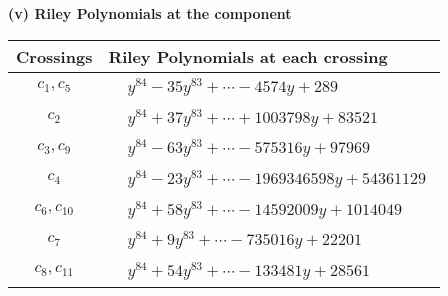 \documentclass[1p]{elsarticle_modified}
\theoremstyle{definition}
\begin{document}
\flushleft \textbf{(v) Riley Polynomials at the component}\newline \\
\begin{tabular}{m{50pt}|m{274pt}}
Crossings & \hspace{64pt}Riley Polynomials at each crossing \\
\hline $$\begin{aligned}c_{1},c_{5}\end{aligned}$$&$\begin{aligned}
&y^{84}-35 y^{83}+\cdots-4574 y+289
\end{aligned}$\\
\hline $$\begin{aligned}c_{2}\end{aligned}$$&$\begin{aligned}
&y^{84}+37 y^{83}+\cdots+1003798 y+83521
\end{aligned}$\\
\hline $$\begin{aligned}c_{3},c_{9}\end{aligned}$$&$\begin{aligned}
&y^{84}-63 y^{83}+\cdots-575316 y+97969
\end{aligned}$\\
\hline $$\begin{aligned}c_{4}\end{aligned}$$&$\begin{aligned}
&y^{84}-23 y^{83}+\cdots-1969346598 y+54361129
\end{aligned}$\\
\hline $$\begin{aligned}c_{6},c_{10}\end{aligned}$$&$\begin{aligned}
&y^{84}+58 y^{83}+\cdots-14592009 y+1014049
\end{aligned}$\\
\hline $$\begin{aligned}c_{7}\end{aligned}$$&$\begin{aligned}
&y^{84}+9 y^{83}+\cdots-735016 y+22201
\end{aligned}$\\
\hline $$\begin{aligned}c_{8},c_{11}\end{aligned}$$&$\begin{aligned}
&y^{84}+54 y^{83}+\cdots-133481 y+28561
\end{aligned}$\\
\hline
\end{tabular}\\~\\
\end{document}
